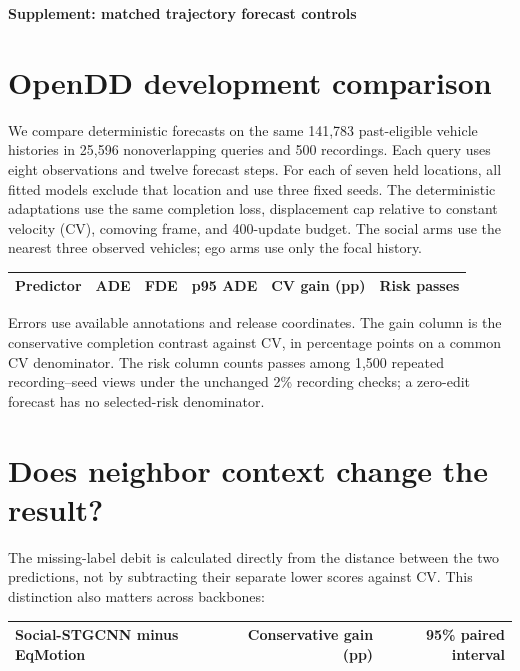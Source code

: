 \documentclass[10pt]{article}
\begin{document}
{\Large\bfseries Supplement: matched trajectory forecast controls}

\section*{OpenDD development comparison}

We compare deterministic forecasts on the same 141,783 past-eligible
vehicle histories in 25,596 nonoverlapping queries and 500 recordings.
Each query uses eight observations and twelve forecast steps. For each
of seven held locations, all fitted models exclude that location and
use three fixed seeds. The deterministic adaptations use the same
completion loss, displacement cap relative to constant velocity (CV),
comoving frame, and 400-update budget. The social arms use the nearest
three observed vehicles; ego arms use only the focal history.

\smallskip
\begin{center}
\begin{tabular}{@{}lrrrrr@{}}
\toprule
Predictor & ADE & FDE & p95 ADE & CV gain (pp) & Risk passes\\
\midrule
\bottomrule
\end{tabular}
\end{center}
\smallskip

Errors use available annotations and release coordinates. The gain
column is the conservative completion contrast against CV, in percentage
points on a common CV denominator. The risk column counts passes among
1,500 repeated recording--seed views under the unchanged 2\% recording
checks; a zero-edit forecast has no selected-risk denominator.

\section*{Does neighbor context change the result?}

The missing-label debit is calculated directly from the distance
between the two predictions, not by subtracting their separate lower
scores against CV. This distinction also matters across backbones:

\smallskip
\begin{center}
\begin{tabular}{@{}lrr@{}}
\toprule
Social-STGCNN minus EqMotion & Conservative gain (pp) & 95\% paired interval\\
\midrule
\bottomrule
\end{tabular}
\end{center}
\smallskip
\end{document}
